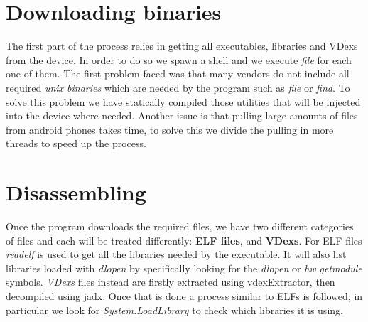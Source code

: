 \documentclass[a4paper,11pt,oneside]{report}
\begin{document}
\section{Downloading binaries}
The first part of the process relies in getting all executables, libraries
and VDexs from the device. In order to do so we spawn a shell and we execute
\emph{file} for each one of them. The first problem faced was that many vendors
do not include all required \emph{unix binaries} which are needed by the program
such as \emph{file} or \emph{find}. To solve this problem we have statically
compiled those utilities that will be injected into the device where needed.
Another issue is that pulling large amounts of files from android phones takes
time, to solve this we divide the pulling in more threads to speed up the
process.

\section{Disassembling}
Once the program downloads the required files, we have two different categories
of files and each will be treated differently: \textbf{ELF files},
and \textbf{VDexs}. For ELF files \emph{readelf} is used to get all the libraries
needed by the executable. It will also list libraries loaded with \emph{dlopen}
by specifically looking for the \emph{dlopen} or
\emph{hw \textunderscore get\textunderscore module} symbols.
\emph{VDexs} files instead are firstly extracted using vdexExtractor, then
decompiled using jadx. Once that is done a process similar to ELFs is followed,
in particular we look for \emph{System.LoadLibrary} to check which libraries
it is using.
\end{document}
